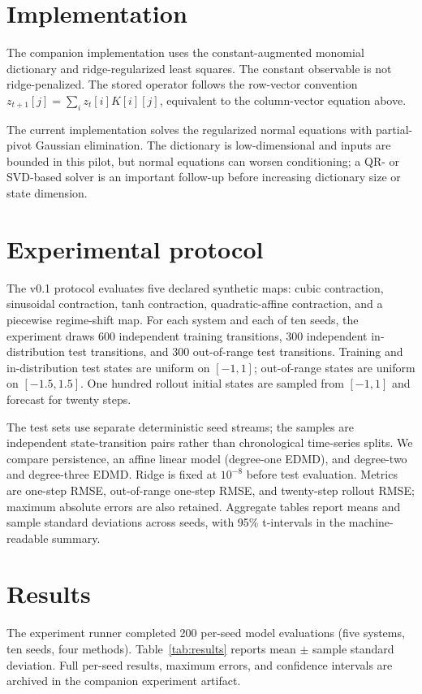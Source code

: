 \documentclass[11pt]{article}
\begin{document}
\section{Implementation}
The companion implementation uses the constant-augmented monomial dictionary and ridge-regularized least squares. The constant observable is not ridge-penalized. The stored operator follows the row-vector convention $z_{t+1}[j]=\sum_i z_t[i]K[i][j]$, equivalent to the column-vector equation above.

The current implementation solves the regularized normal equations with partial-pivot Gaussian elimination. The dictionary is low-dimensional and inputs are bounded in this pilot, but normal equations can worsen conditioning; a QR- or SVD-based solver is an important follow-up before increasing dictionary size or state dimension.

\section{Experimental protocol}
The v0.1 protocol evaluates five declared synthetic maps: cubic contraction, sinusoidal contraction, tanh contraction, quadratic-affine contraction, and a piecewise regime-shift map. For each system and each of ten seeds, the experiment draws 600 independent training transitions, 300 independent in-distribution test transitions, and 300 out-of-range test transitions. Training and in-distribution test states are uniform on $[-1,1]$; out-of-range states are uniform on $[-1.5,1.5]$. One hundred rollout initial states are sampled from $[-1,1]$ and forecast for twenty steps.

The test sets use separate deterministic seed streams; the samples are independent state-transition pairs rather than chronological time-series splits. We compare persistence, an affine linear model (degree-one EDMD), and degree-two and degree-three EDMD. Ridge is fixed at $10^{-8}$ before test evaluation. Metrics are one-step RMSE, out-of-range one-step RMSE, and twenty-step rollout RMSE; maximum absolute errors are also retained. Aggregate tables report means and sample standard deviations across seeds, with 95\% t-intervals in the machine-readable summary.

\section{Results}
The experiment runner completed 200 per-seed model evaluations (five systems, ten seeds, four methods). Table~\ref{tab:results} reports mean $\pm$ sample standard deviation. Full per-seed results, maximum errors, and confidence intervals are archived in the companion experiment artifact.
\end{document}
